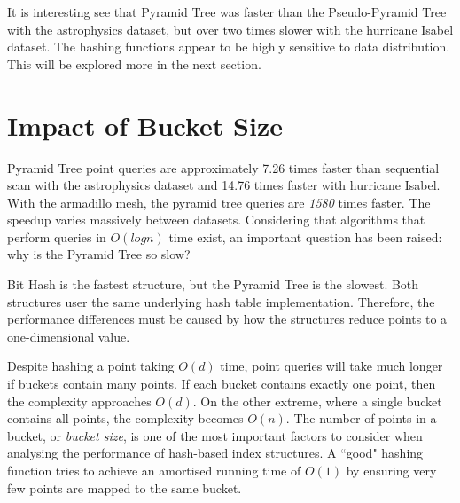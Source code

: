 It is interesting see that Pyramid Tree was faster than the Pseudo-Pyramid Tree with the astrophysics dataset, but over two times slower with the hurricane Isabel dataset. The hashing functions appear to be highly sensitive to data distribution. This will be explored more in the next section.

\section{Impact of Bucket Size}

Pyramid Tree point queries are approximately 7.26 times faster than sequential scan with the astrophysics dataset and 14.76 times faster with hurricane Isabel. With the armadillo mesh, the pyramid tree queries are \textit{1580} times faster. The speedup varies massively between datasets. Considering that algorithms that perform queries in $O(log n)$ time exist, an important question has been raised: why is the Pyramid Tree so slow?

Bit Hash is the fastest structure, but the Pyramid Tree is the slowest. Both structures user the same underlying hash table implementation. Therefore, the performance differences must be caused by how the structures reduce points to a one-dimensional value. 

Despite hashing a point taking $O(d)$ time, point queries will take much longer if buckets contain many points. If each bucket contains exactly one point, then the complexity approaches $O(d)$. On the other extreme, where a single bucket contains all points, the complexity becomes $O(n)$. The number of points in a bucket, or \textit{bucket size}, is one of the most important factors to consider when analysing the performance of hash-based index structures. A ``good" hashing function tries to achieve an amortised running time of $O(1)$ by ensuring very few points are mapped to the same bucket.

